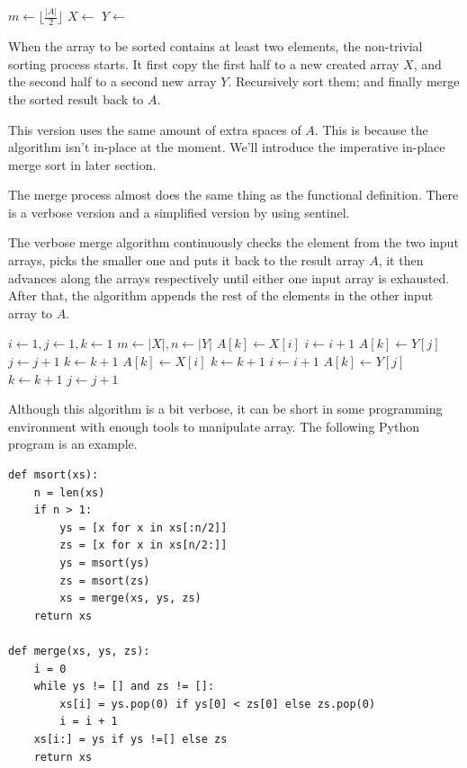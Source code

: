 \documentclass[b5paper]{article}
\begin{document}
\begin{algorithmic}[1]
    \State $m \gets \lfloor \frac{|A|}{2} \rfloor$
    \State $X \gets$ 
    \State $Y \gets$ 
    \State {}
    \State {}
    \State {}
  \EndIf
\EndProcedure
\end{algorithmic}

When the array to be sorted contains at least two elements, the non-trivial sorting process starts.
It first copy the first half to a new created array $X$, and the second half to a second new array $Y$.
Recursively sort them; and finally merge the sorted result back to $A$.

This version uses the same amount of extra spaces of $A$. This is because the  algorithm
isn't in-place at the moment. We'll introduce the imperative in-place merge sort in later section.

The merge process almost does the same thing as the functional definition. There is a verbose version
and a simplified version by using sentinel.

The verbose merge algorithm continuously checks the element from the two input arrays, picks the smaller one
and puts it back to the result array $A$, it then advances along the arrays respectively until either
one input array is exhausted. After that, the algorithm appends the rest of the elements in the other
input array to $A$.

\begin{algorithmic}[1]
  \State $i \gets 1, j\gets 1, k\gets 1$
  \State $m \gets |X|, n \gets |Y|$
      \State $A[k] \gets X[i]$
      \State $i \gets i + 1$
    \Else
      \State $A[k] \gets Y[j]$
      \State $j \gets j + 1$
    \EndIf
    \State $k \gets k + 1$
  \EndWhile
    \State $A[k] \gets X[i]$
    \State $k \gets k + 1$
    \State $i \gets i + 1$
  \EndWhile
    \State $A[k] \gets Y[j]$
    \State $k \gets k + 1$
    \State $j \gets j + 1$
  \EndWhile
\EndProcedure
\end{algorithmic}

Although this algorithm is a bit verbose, it can be short in some programming environment with enough tools
to manipulate array. The following Python program is an example.

\lstset{language=Python}
\begin{lstlisting}
def msort(xs):
    n = len(xs)
    if n > 1:
        ys = [x for x in xs[:n/2]]
        zs = [x for x in xs[n/2:]]
        ys = msort(ys)
        zs = msort(zs)
        xs = merge(xs, ys, zs)
    return xs

def merge(xs, ys, zs):
    i = 0
    while ys != [] and zs != []:
        xs[i] = ys.pop(0) if ys[0] < zs[0] else zs.pop(0)
        i = i + 1
    xs[i:] = ys if ys !=[] else zs
    return xs
\end{lstlisting}
\end{document}
